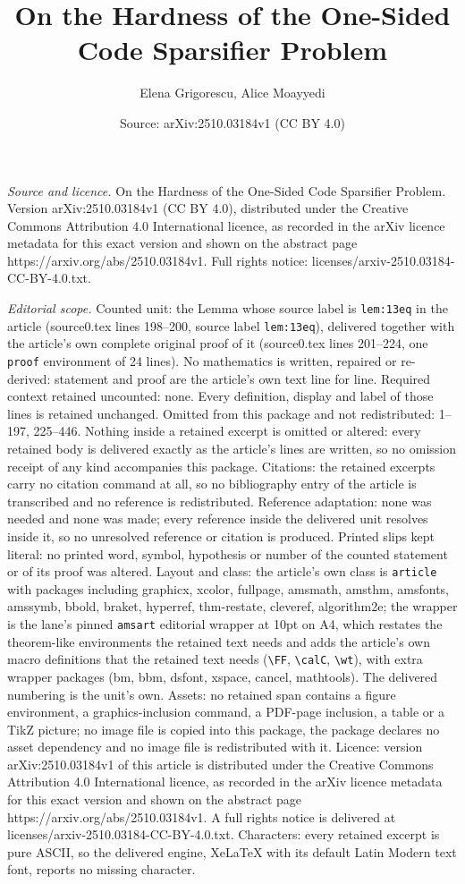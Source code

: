 \documentclass[10pt,a4paper]{amsart}
\title[On the Hardness of the One-Sided Code Sparsifier Problem]{On the Hardness of the One-Sided Code Sparsifier Problem}
\author{Elena Grigorescu, Alice Moayyedi}
\date{Source: arXiv:2510.03184v1 (CC BY 4.0)}
\begin{document}
\maketitle

\noindent\emph{Source and licence.} On the Hardness of the One-Sided Code Sparsifier Problem. Version arXiv:2510.03184v1 (CC BY 4.0), distributed under the Creative Commons Attribution 4.0 International licence, as recorded in the arXiv licence metadata for this exact version and shown on the abstract page https://arxiv.org/abs/2510.03184v1. Full rights notice: licenses/arxiv-2510.03184-CC-BY-4.0.txt.\par\smallskip

\noindent\textit{Editorial scope.} Counted unit: the Lemma whose source label is \texttt{lem:13eq} in the article (source0.tex lines 198--200, source label \texttt{lem:13eq}), delivered together with the article's own complete original proof of it (source0.tex lines 201--224, one \texttt{proof} environment of 24 lines). No mathematics is written, repaired or re-derived: statement and proof are the article's own text line for line. Required context retained uncounted: none. Every definition, display and label of those lines is retained unchanged. Omitted from this package and not redistributed: 1--197, 225--446. Nothing inside a retained excerpt is omitted or altered: every retained body is delivered exactly as the article's lines are written, so no omission receipt of any kind accompanies this package. Citations: the retained excerpts carry no citation command at all, so no bibliography entry of the article is transcribed and no reference is redistributed. Reference adaptation: none was needed and none was made; every reference inside the delivered unit resolves inside it, so no unresolved reference or citation is produced. Printed slips kept literal: no printed word, symbol, hypothesis or number of the counted statement or of its proof was altered. Layout and class: the article's own class is \texttt{article} with packages including graphicx, xcolor, fullpage, amsmath, amsthm, amsfonts, amssymb, bbold, braket, hyperref, thm-restate, cleveref, algorithm2e; the wrapper is the lane's pinned \texttt{amsart} editorial wrapper at 10pt on A4, which restates the theorem-like environments the retained text needs and adds the article's own macro definitions that the retained text needs (\texttt{\textbackslash FF}, \texttt{\textbackslash calC}, \texttt{\textbackslash wt}), with extra wrapper packages (bm, bbm, dsfont, xspace, cancel, mathtools). The delivered numbering is the unit's own. Assets: no retained span contains a figure environment, a graphics-inclusion command, a PDF-page inclusion, a table or a TikZ picture; no image file is copied into this package, the package declares no asset dependency and no image file is redistributed with it. Licence: version arXiv:2510.03184v1 of this article is distributed under the Creative Commons Attribution 4.0 International licence, as recorded in the arXiv licence metadata for this exact version and shown on the abstract page https://arxiv.org/abs/2510.03184v1. A full rights notice is delivered at licenses/arxiv-2510.03184-CC-BY-4.0.txt. Characters: every retained excerpt is pure ASCII, so the delivered engine, XeLaTeX with its default Latin Modern text font, reports no missing character.
\end{document}
